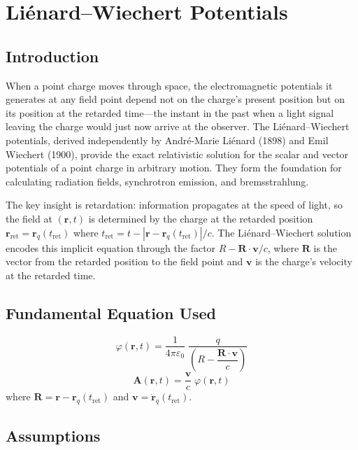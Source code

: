 \chapter{Liénard--Wiechert Potentials}

\section*{Introduction}

When a point charge moves through space, the electromagnetic potentials it generates at any field point depend not on the charge's present position but on its position at the retarded time---the instant in the past when a light signal leaving the charge would just now arrive at the observer. The Liénard--Wiechert potentials, derived independently by André-Marie Liénard (1898) and Emil Wiechert (1900), provide the exact relativistic solution for the scalar and vector potentials of a point charge in arbitrary motion. They form the foundation for calculating radiation fields, synchrotron emission, and bremsstrahlung.

The key insight is retardation: information propagates at the speed of light, so the field at $(\mathbf{r}, t)$ is determined by the charge at the retarded position $\mathbf{r}_{\text{ret}} = \mathbf{r}_{q}(t_{\text{ret}})$ where $t_{\text{ret}} = t - |\mathbf{r} - \mathbf{r}_{q}(t_{\text{ret}})|/c$. The Liénard--Wiechert solution encodes this implicit equation through the factor $R - \mathbf{R}\cdot\mathbf{v}/c$, where $\mathbf{R}$ is the vector from the retarded position to the field point and $\mathbf{v}$ is the charge's velocity at the retarded time.
\section*{Fundamental Equation Used}

\begin{equation}
\boxed{\;\varphi(\mathbf{r},t) = \frac{1}{4\pi\varepsilon_{0}}\;\frac{q}{\left(R - \dfrac{\mathbf{R}\cdot\mathbf{v}}{c}\right)}\;}
\label{eq:lienard-wiechert-phi}
\end{equation}
\begin{equation}
\boxed{\;\mathbf{A}(\mathbf{r},t) = \frac{\mathbf{v}}{c}\;\varphi(\mathbf{r},t)\;}
\label{eq:lienard-wiechert-A}
\end{equation}
where $\mathbf{R} = \mathbf{r} - \mathbf{r}_{q}(t_{\text{ret}})$ and $\mathbf{v} = \dot{\mathbf{r}}_{q}(t_{\text{ret}})$.
\section*{Assumptions}

